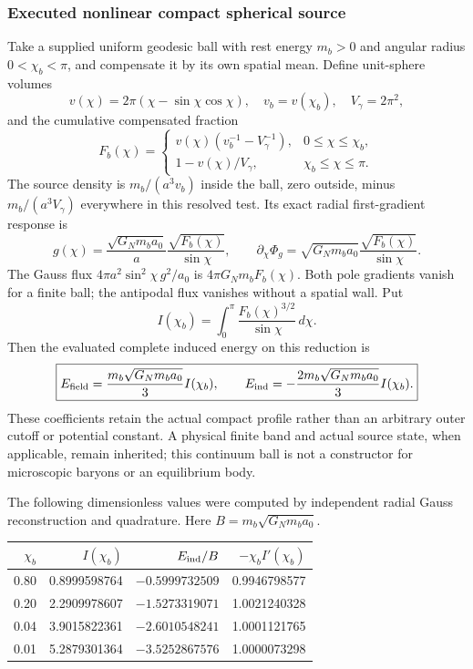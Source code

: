 \documentclass[12pt,a4paper]{article}
\begin{document}
\subsubsection{Executed nonlinear compact spherical source}
Take a supplied uniform geodesic ball with rest energy $m_b>0$ and angular
radius $0<\chi_b<\pi$, and compensate it by its own spatial mean.
Define unit-sphere volumes
\[
 v(\chi)=2\pi(\chi-\sin\chi\cos\chi),\quad
 v_b=v(\chi_b),\quad V_\gamma=2\pi^2,
\]
and the cumulative compensated fraction
\begin{equation}
\label{p8:eq:v2207-cubic-ball-fraction}
 F_b(\chi)=
 \begin{cases}
   v(\chi)(v_b^{-1}-V_\gamma^{-1}),&0\le\chi\le\chi_b,\\
   1-v(\chi)/V_\gamma,&\chi_b\le\chi\le\pi.
 \end{cases}
\end{equation}
The source density is $m_b/(a^3v_b)$ inside the ball, zero outside,
minus $m_b/(a^3V_\gamma)$ everywhere in this resolved test. Its exact
radial first-gradient response is
\begin{equation}
\label{p8:eq:v2207-cubic-ball-field}
 \boxed{g(\chi)=\frac{\sqrt{G_Nm_ba_0}}a
                  \frac{\sqrt{F_b(\chi)}}{\sin\chi},\qquad
 \partial_\chi\Phi_g=\sqrt{G_Nm_ba_0}
                  \frac{\sqrt{F_b(\chi)}}{\sin\chi}.}
\end{equation}
The Gauss flux $4\pi a^2\sin^2\chi\,g^2/a_0$ is
$4\pi G_Nm_bF_b(\chi)$. Both pole gradients vanish for a finite ball;
the antipodal flux vanishes without a spatial wall. Put
\begin{equation}
\label{p8:eq:v2207-cubic-ball-integral}
 I(\chi_b)=\int_0^\pi\frac{F_b(\chi)^{3/2}}{\sin\chi}\,d\chi.
\end{equation}
Then the evaluated complete induced energy on this reduction is
\begin{equation}
\label{p8:eq:v2207-cubic-ball-energy}
 \boxed{E_{\rm field}=\frac{m_b\sqrt{G_Nm_ba_0}}3I(\chi_b),\qquad
 E_{\rm ind}=-\frac{2m_b\sqrt{G_Nm_ba_0}}3I(\chi_b).}
\end{equation}
These coefficients retain the actual compact profile rather than an
arbitrary outer cutoff or potential constant. A physical finite band and
actual source state, when applicable, remain inherited; this continuum
ball is not a constructor for microscopic baryons or an equilibrium body.

The following dimensionless values were computed by independent radial
Gauss reconstruction and quadrature. Here
$B=m_b\sqrt{G_Nm_ba_0}$.
\begin{center}
\begin{tabular}{rrrr}
\hline
$\chi_b$ & $I(\chi_b)$ & $E_{\rm ind}/B$ & $-\chi_b I'(\chi_b)$\\
\hline
0.80 & 0.8999598764 & $-0.5999732509$ & 0.9946798577\\
0.20 & 2.2909978607 & $-1.5273319071$ & 1.0021240328\\
0.04 & 3.9015822361 & $-2.6010548241$ & 1.0001121765\\
0.01 & 5.2879301364 & $-3.5252867576$ & 1.0000073298\\
\hline
\end{tabular}
\end{center}
\end{document}
